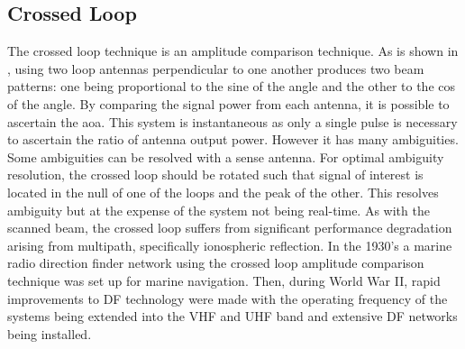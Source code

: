\subsection{Crossed Loop}
The crossed loop technique is an amplitude comparison technique. 
As is shown in , using two loop antennas perpendicular to one another produces two beam patterns: one being proportional to the sine of the angle and the other to the cos of the angle. 
By comparing the signal power from each antenna, it is possible to ascertain the \gls{aoa}. This system is instantaneous as only a single pulse is necessary to ascertain the ratio of antenna output power. However it has many ambiguities. Some ambiguities can be resolved with a sense antenna. 
For optimal ambiguity resolution, the crossed loop should be rotated such that signal of interest is located in the null of one of the loops and the peak of the other. This resolves ambiguity but at the expense of the system not being real-time.
As with the scanned beam, the crossed loop suffers from significant performance degradation arising from multipath, specifically ionospheric reflection. 
In the 1930's a marine radio direction finder network using the crossed loop amplitude comparison technique was set up for marine navigation. Then, during World War II, rapid improvements to DF technology were made with the operating frequency of the systems being extended into the VHF and UHF band  and extensive DF networks being installed\cite{jenkins1991smallaperture}.
